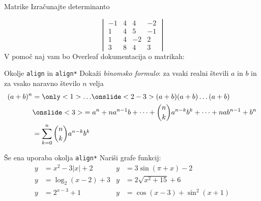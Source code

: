\begin{frame}{Matrike}
	Izračunajte determinanto

	$$
	\begin{vmatrix}
	-1 & 4 & 4 & -2 \\
	1 & 4 & 5 & -1 \\
	1 & 4 & -2 & 2 \\
	3 & 8 & 4 & 3
	\end{vmatrix}
	$$
	V pomoč naj vam bo Overleaf dokumentacija o matrikah:
	
	\href{https://www.overleaf.com/learn/latex/Matrices}{}
\end{frame}

\begin{frame}{Okolje \texttt{align} in \texttt{align*}}
	Dokaži \emph{binomsko formulo}: za vsaki realni števili $a$ in $b$ in za vsako naravno število $n$ velja
	\begin{align*}
	(a+b)^n& = \only<1>{\ldots}
	\onslide<2-3>{(a+b) (a+b) \dots (a+b)}\\
	& \onslide<3>{= a^n + n a^{n-1} b + \dots + \binom{n}{k} a^{n-k} b^k + \dots + n a b^{n-1} + b^n}\\
	& = \sum_{k=0}^n \binom{n}{k} a^{n-k} b^k
	\end{align*}
\end{frame}

\begin{frame}{Še ena uporaba okolja \texttt{align*}}
	Nariši grafe funkcij:
	\begin{align*}
	y& = x^2 - 3|x| + 2   & y &= 3 \sin(\pi+x) - 2 \\
	y& = \log_2(x-2) + 3  & y &= 2 \sqrt{x^2+15} + 6 \\
	y& = 2^{x-3} + 1      & y &= \cos(x-3) + \sin^2(x+1) \\
	\end{align*}
\end{frame}

